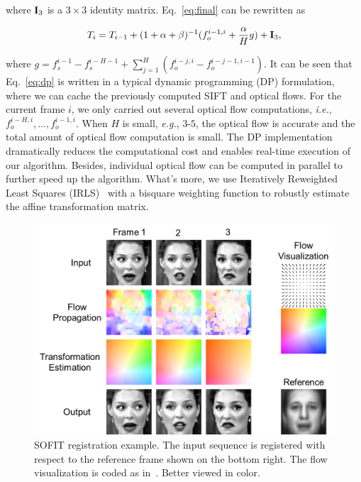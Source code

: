 \documentclass[review]{elsarticle}
\begin{document}
\noindent where ${\bf I}_3$ is a $3\times 3$ identity matrix. Eq.~\eqref{eq:final} can be rewritten as

\begin{align}
\label{eq:dp}
T_i=T_{i-1}+(1+\alpha+\beta)^{-1}(f_o^{i-1,i}+\frac{\alpha}{H}g) + {\bf I}_3,
\end{align}

\noindent where $g=f_s^{i-1}-f_s^{i-H-1}+\sum_{j=1}^H(f_o^{i-j,i}-f_o^{i-j-1,i-1})$. It can be seen that Eq.~\eqref{eq:dp} is written in a typical dynamic programming (DP) formulation, where we can cache the previously computed SIFT and optical flows. For the current frame $i$, we only carried out several optical flow computations, \textit{i.e.}, $f_o^{i-H,i},\ldots,f_o^{i-1,i}$. When $H$ is small, \textit{e.g.}, $3$-$5$, the optical flow is accurate and the total amount of optical flow computation is small. The DP implementation dramatically reduces the computational cost and enables real-time execution of our algorithm. Besides, individual optical flow can be computed in parallel to further speed up the algorithm. What's more, we use Iteratively Reweighted Least Squares (IRLS)~\cite{Huber81} with a bisquare weighting function to robustly estimate the affine transformation matrix. 

\begin{figure}[htbp]
	\centering
	\includegraphics[width=\columnwidth]{fig/theory_example.png}
	\caption{SOFIT registration example. The input sequence is registered with respect to the reference frame shown on the bottom right. The flow visualization is coded as in~\cite{Baker_ICCV07}. Better viewed in color.}
	\label{fig_theory_example}
\end{figure}
\end{document}

